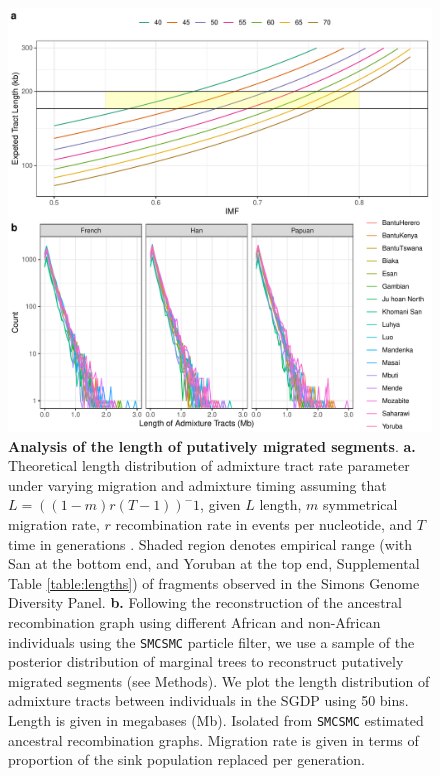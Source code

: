 \documentclass{article}
\begin{document}
\begin{figure}
    \centering
    \includegraphics[width=\textwidth]{plot/both_length.pdf}
    \caption{ {\bf Analysis of the length of putatively migrated segments}. {\bf a.} Theoretical length distribution of admixture tract rate parameter under varying migration and admixture timing assuming that $L = ((1-m)r(T-1))^-1$, given $L$ length, $m$ symmetrical migration rate, $r$ recombination rate in events per nucleotide, and $T$ time in generations \cite{Liang953}. Shaded region denotes empirical range (with San at the bottom end, and Yoruban at the top end, Supplemental Table \ref{table:lengths}) of fragments observed in the Simons Genome Diversity Panel. {\bf b.} Following the reconstruction of the ancestral recombination graph using different African and non-African individuals using the {\tt SMCSMC} particle filter, we use a sample of the posterior distribution of marginal trees to reconstruct putatively migrated segments (see Methods). We plot the length distribution of admixture tracts between individuals in the SGDP using 50 bins. Length is given in megabases (Mb). Isolated from {\tt SMCSMC} estimated ancestral recombination graphs. Migration rate is given in terms of proportion of the sink population replaced per generation. }
    \label{fig:length}
\end{figure}
\end{document}
